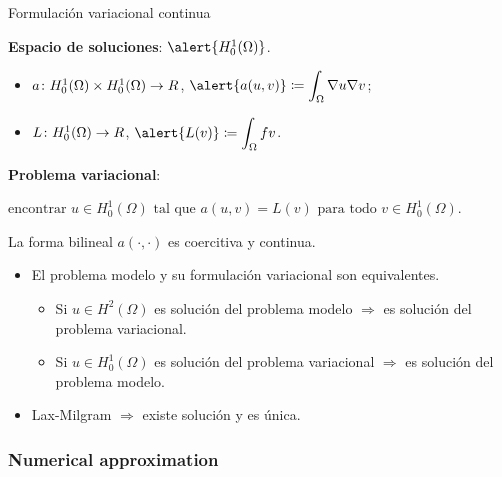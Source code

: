 \begin{frame}[allowframebreaks]{Formulación variacional continua}

\textbf{Espacio de soluciones}: $\alert{H_0^1(\Omega)}$.
\begin{itemize}\itemsep1em
	\item $a\colon H^1_0(\Omega)\times H_0^1(\Omega)\to\relax R$, $\displaystyle \alert{a(u,v)}\coloneqq\int_\Omega\nabla u\nabla v$;
	\item $L\colon H_0^1(\Omega)\to\relax R$, $\displaystyle \alert{L(v)}\coloneqq\int_\Omega f v$.
\end{itemize}
\textbf{Problema variacional}:
\begin{block}{}
	\begin{center}
	\label{form_var_Poisson}
	$\text{encontrar } u\in H^1_0(\Omega) \text{ tal que } a(u,v)=L(v)\text{ para todo } v\in H_0^1(\Omega)$.
	\end{center}
\end{block}
\framebreak
\begin{theorem}
	La forma bilineal $a(\cdot,\cdot)$ es coercitiva y continua.
\end{theorem}

\begin{itemize}\itemsep1em
	\item El problema modelo y su formulación variacional son \alert{equivalentes}.
	\begin{itemize}\itemsep1em
		\item Si $u\in H^2(\Omega)$ es solución del problema modelo $\Rightarrow$ es solución del problema variacional.
		\item Si $u\in H_0^1(\Omega)$ es solución del problema variacional $\Rightarrow$ es solución del problema modelo.
	\end{itemize}
	\item \alert{Lax-Milgram} $\Rightarrow$ existe solución y es única.
\end{itemize}

\end{frame}

\subsubsection{Numerical approximation}

